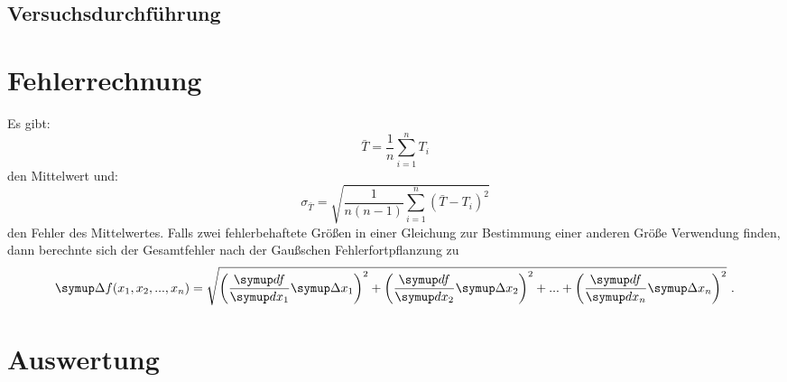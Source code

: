 \subsection{Versuchsdurchführung}

\section{Fehlerrechnung}
Es gibt:
\begin{equation}
  \bar{T} = \frac{1}{n} \sum_{i=1}^{n} T_{i}
  \label{eqn:1}
\end{equation}
den Mittelwert und:
\begin{equation}
  \sigma_{\bar{T}} = \sqrt{\frac{1}{n(n-1)} \sum_{i=1}^{n}(\bar{T}-T_i)^2}
  \label{eqn:2}
\end{equation}
den Fehler des Mittelwertes. Falls zwei fehlerbehaftete Größen in einer Gleichung
zur Bestimmung einer anderen Größe Verwendung finden, dann berechnte sich der Gesamtfehler
nach der Gaußschen Fehlerfortpflanzung zu
\begin{equation}
    \symup \Delta f(x_1, x_2, ..., x_n) = \sqrt{\left(\frac{\symup df}{\symup dx_1} \symup \Delta
    x_1 \right)^2 +    \left(\frac{\symup df}{\symup dx_2} \symup \Delta
    x_2 \right)^2 + ... + \left(\frac{\symup df}{\symup dx_n} \symup \Delta x_n \right)^2} \ .
    \label{eqn:3}
\end{equation}

\section{Auswertung}
